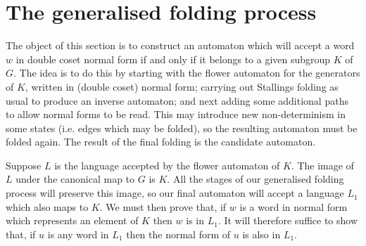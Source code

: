 \documentclass[a4paper,12pt]{article}
\newcommand{\G}{\Gamma }
\numberwithin{equation}{section}
\numberwithin{figure}{section}
\newcommand{\FF}{\ensuremath{\mathbb{F}}}
\begin{document}
\section{The generalised folding process}\label{sec:foldings}

The object of this section is to construct an automaton which will accept a word
$w$ in double coset normal form if and only if it belongs to a
given subgroup $K$ of $G$. The idea is to do this by starting with the
flower automaton for the generators of $K$, written in (double
coset) normal form; carrying out Stallings folding as usual to
produce an inverse automaton; and next
adding some additional paths to allow normal forms to be read.
This may introduce new non-determinism in some  states (i.e. edges
which may be folded), so the resulting automaton must be folded
again. The result of the final folding is the candidate automaton.

 Suppose $L$ is the
language accepted by the flower automaton of $K$. The image of $L$ under
the canonical map to $G$ is $K$. All the stages of our generalised folding
process will preserve this image, so our final automaton will accept a language
$L_1$ which also maps to $K$. We must then prove that, if $w$ is a word
in normal form which represents an element of $K$ then $w$ is in $L_1$. It will
therefore suffice to show that, if $u$ is any word in $L_1$ then the
normal form of $u$ is also in $L_1$.

\end{document}
